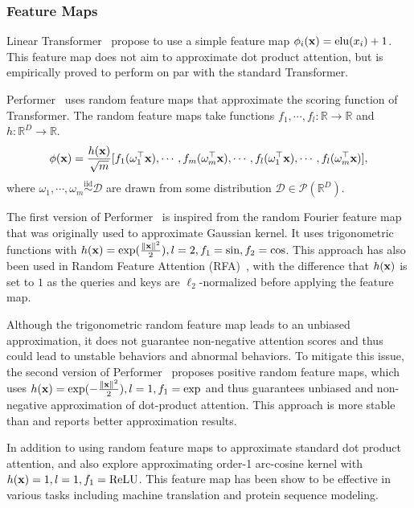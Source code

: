 \documentclass[manuscript,acmsmall,screen,nonacm]{acmart}
\theoremstyle{definition}
\begin{document}
\subsubsection{Feature Maps}
Linear Transformer~\cite{katharopoulos2020linearxformer} propose to use a simple feature map $\phi_i(\mathbf{x})=\mathrm{elu}(x_i)+1$. This feature map does not aim to approximate dot product attention, but is empirically proved to perform on par with the standard Transformer.

Performer~\cite{choromanski2020masked,choromanski2020rethinking} uses random feature maps that approximate the scoring function of Transformer. The random feature maps take functions $f_1,\cdots,f_l:\mathbb R\rightarrow \mathbb R$ and $h:\mathbb{R}^D\rightarrow \mathbb R$.
\begin{equation}
    \phi(\mathbf{x}) = \frac{h(\mathbf{x})}{\sqrt{m}}[f_1(\omega_1^\top \mathbf{x}),\cdots,f_m(\omega_m^\top \mathbf{x}),\cdots,f_l(\omega_1^\top \mathbf{x}),\cdots,f_l(\omega_m^\top \mathbf{x})],
\end{equation}
where $\omega_1,\cdots,\omega_m\stackrel{\text{iid}}{\sim} \mathcal D$ are drawn from some distribution $\mathcal D\in\mathcal P(\mathbb{R}^D)$.

The first version of Performer~\cite{choromanski2020masked} is inspired from the random Fourier feature map~\cite{rahmi07random} that was originally used to approximate Gaussian kernel. It uses trigonometric functions with $h(\mathbf{x})=\exp(\frac{\|\mathbf{x}\|^2}{2}), l=2, f_1=\sin, f_2=\cos$. This approach has also been used in Random Feature Attention (RFA)~\cite{peng2021random}, with the difference that $h(\mathbf{x})$ is set to $1$ as the queries and keys are $\ell_2$-normalized before applying the feature map.

Although the trigonometric random feature map leads to an unbiased approximation, it does not guarantee non-negative attention scores and thus could lead to unstable behaviors and abnormal behaviors. To mitigate this issue, the second version of Performer~\cite{choromanski2020rethinking} proposes positive random feature maps, which uses $h(\mathbf{x})=\exp(-\frac{\|\mathbf{x}\|^2}{2}),l=1,f_1=\exp$ and thus guarantees unbiased and non-negative approximation of dot-product attention. This approach is more stable than \citet{choromanski2020masked} and reports better approximation results.

In addition to using random feature maps to approximate standard dot product attention, \citet{peng2021random} and \citet{choromanski2020rethinking} also explore approximating order-1 arc-cosine kernel with $h(\mathbf{x})=1,l=1,f_1=\mathrm{ReLU}$. This feature map has been show to be effective in various tasks including machine translation and protein sequence modeling.
\end{document}
